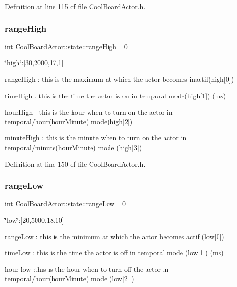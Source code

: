Definition at line 115 of file Cool\+Board\+Actor.\+h.

\mbox{\label{struct_cool_board_actor_1_1state_a6e5cd6c5cd44e2decfd8d4df1853f8e3}} 
\subsubsection{\texorpdfstring{range\+High}{rangeHigh}}
{\footnotesize\ttfamily int Cool\+Board\+Actor\+::state\+::range\+High =0}

\char`\"{}high\char`\"{}\+:\mbox{[}30,2000,17,1\mbox{]}

range\+High \+: this is the maximum at which the actor becomes inactif(high\mbox{[}0\mbox{]})

time\+High \+: this is the time the actor is on in temporal mode(high\mbox{[}1\mbox{]}) (ms)

hour\+High \+: this is the hour when to turn on the actor in temporal/hour(hour\+Minute) mode(high\mbox{[}2\mbox{]})

minute\+High \+: this is the minute when to turn on the actor in temporal/minute(hour\+Minute) mode (high\mbox{[}3\mbox{]}) 

Definition at line 150 of file Cool\+Board\+Actor.\+h.

\mbox{\label{struct_cool_board_actor_1_1state_a43f891c9fb3bb63575c27cec860de55a}} 
\subsubsection{\texorpdfstring{range\+Low}{rangeLow}}
{\footnotesize\ttfamily int Cool\+Board\+Actor\+::state\+::range\+Low =0}

\char`\"{}low\char`\"{}\+:\mbox{[}20,5000,18,10\mbox{]}

range\+Low \+: this is the minimum at which the actor becomes actif (low\mbox{[}0\mbox{]})

time\+Low \+: this is the time the actor is off in temporal mode (low\mbox{[}1\mbox{]}) (ms)

hour low \+:this is the hour when to turn off the actor in temporal/hour(hour\+Minute) mode (low\mbox{[}2\mbox{]} )

